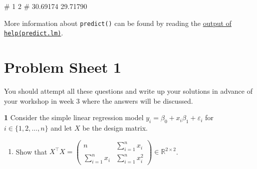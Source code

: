 \documentclass[
  a4paper,
]{article}
\newenvironment{Shaded}{\begin{snugshade}}{\end{snugshade}}
\newcommand{\NormalTok}[1]{#1}
\providecommand{\tightlist}{%
  \setlength{\itemsep}{0pt}\setlength{\parskip}{0pt}}
\theoremstyle{definition}
\theoremstyle{definition}
\theoremstyle{definition}
\theoremstyle{definition}
\theoremstyle{remark}
\begin{document}
\begin{Shaded}
\begin{Highlighting}[]
\NormalTok{\#        1        2 }
\NormalTok{\# 30.69174 29.71790}
\end{Highlighting}
\end{Shaded}

More information about \texttt{predict()} can be found by reading
the \href{https://rdrr.io/r/stats/predict.html}{output of \texttt{help(predict.lm)}}.

\clearpage

\hypertarget{P01}{%
\section*{Problem Sheet 1}\label{P01}}

You should attempt all these questions and write up your solutions in advance
of your workshop in week 3 where the answers will be discussed.

\textbf{1} Consider the simple linear regression model
\(y_i = \beta_0 + x_{i} \beta_1 + \varepsilon_i\) for
\(i \in \{1, 2, \ldots, n\}\) and let \(X\) be the design matrix.

\begin{enumerate}
\def\labelenumi{\alph{enumi}.}
\tightlist
\item
  Show that \(\displaystyle X^\top X = \begin{pmatrix}  n & \sum_{i=1}^n x_i \\  \sum_{i=1}^n x_i & \sum_{i=1}^n x_i^2  \end{pmatrix} \in \mathbb{R}^{2\times 2}\).
\end{enumerate}
\end{document}
